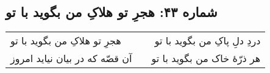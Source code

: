 \begin{center}
\section*{شماره ۴۳: هجرِ تو هلاکِ من بگوید با تو}
\label{sec:043}
\begin{longtable}{l p{0.5cm} r}
هجرِ تو هلاکِ من بگوید با تو
&&
دردِ دلِ پاکِ من بگوید با تو
\\
آن قصّه که در بیان نیاید امروز
&&
هر ذرّهٔ خاک من بگوید با تو
\\
\end{longtable}
\end{center}
